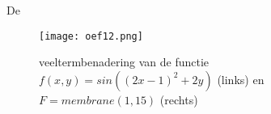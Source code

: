 De 

\begin{figure}[htb]
    \centering
    \texttt{[image: oef12.png]}
    \caption{veeltermbenadering van de functie $f(x,y)=sin((2x-1)^2+2y)$ (links) en $F=membrane(1,15)$ (rechts)}
    \label{fig:oef12}
\end{figure}